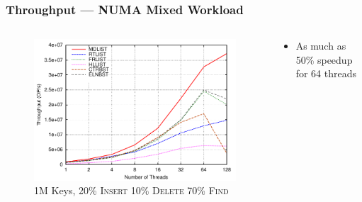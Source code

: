\documentclass{beamer}
\begin{document}
\begin{frame} \frametitle{Throughput --- NUMA Mixed Workload}
    \begin{columns}
        \begin{column}{8cm}
            \begin{figure}[t]
                \centering
                \includegraphics[width=1\columnwidth]{amd20ins1Mkey.pdf}
                \caption{1M Keys, 20\% \textsc{Insert} 10\% \textsc{Delete} 70\% \textsc{Find}}
                \end{figure}
            \end{column}
            \begin{column}{4.3cm}
                \begin{itemize}
                    \item As much as 50\% speedup for 64 threads
                \end{itemize}
            \end{column}
        \end{columns}
\end{frame}
\end{document}
